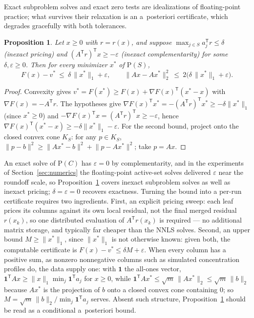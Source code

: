 \documentclass[pdflatex,sn-mathphys-num]{sn-jnl}
\theoremstyle{thmstyleone}
\newtheorem{proposition}{Proposition}
\theoremstyle{thmstyletwo}
\newcommand{\T}{{\mathsf T}}
\newcommand{\prob}[1]{\mathrm{P}(#1)}
\begin{document}
Exact subproblem solves and exact zero tests are idealizations of
floating-point practice; what survives their relaxation is an
a~posteriori certificate, which degrades gracefully with both
tolerances.

\begin{proposition}\label{prop:inexact}
Let $x\ge0$ with $r=r(x)$, and suppose
$\max_{j\in S} a_j^{\T}r\le\delta$ (inexact pricing) and
$(A^{\T}r)^{\T}x\ge-\varepsilon$ (inexact complementarity) for some
$\delta,\varepsilon\ge0$. Then for every minimizer $x^*$ of $\prob{S}$,
\begin{equation*}
F(x)-v^*\ \le\ \delta\,\lVert x^*\rVert_1+\varepsilon,
\qquad
\lVert Ax-Ax^*\rVert_2^2\ \le\ 2\bigl(\delta\,\lVert
x^*\rVert_1+\varepsilon\bigr).
\end{equation*}
\end{proposition}
\begin{proof}
Convexity gives $v^*=F(x^*)\ge F(x)+\nabla F(x)^{\T}(x^*-x)$ with
$\nabla F(x)=-A^{\T}r$. The hypotheses give
$\nabla F(x)^{\T}x^*=-(A^{\T}r)^{\T}x^*\ge-\delta\lVert x^*\rVert_1$
(since $x^*\ge0$) and $-\nabla F(x)^{\T}x=(A^{\T}r)^{\T}x\ge
-\varepsilon$, hence
$\nabla F(x)^{\T}(x^*-x)\ge-\delta\lVert x^*\rVert_1-\varepsilon$.
For the second bound, project onto the closed convex cone $K_S$: for
any $p\in K_S$,
$\lVert p-b\rVert^2\ge\lVert Ax^*-b\rVert^2+\lVert p-Ax^*\rVert^2$;
take $p=Ax$.
\end{proof}
\par\medskip\noindent
An exact solve of $\prob{C}$ has $\varepsilon=0$ by complementarity,
and in the experiments of Section~\ref{sec:numerics} the
floating-point active-set solves delivered $\varepsilon$ near the
roundoff scale, so Proposition~\ref{prop:inexact} covers inexact
subproblem solves as well as inexact pricing; $\delta=\varepsilon=0$
recovers exactness. Turning the bound into a per-run
certificate requires two ingredients. First, an explicit pricing
sweep: each leaf prices its columns against its own local residual,
not the final merged residual $r(x_k)$, so one distributed evaluation
of $A^{\T}r(x_k)$ is required --- no additional matrix storage, and
typically far cheaper than the NNLS solves. Second, an upper bound
$M\ge\lVert x^*\rVert_1$, since $\lVert x^*\rVert_1$ is not otherwise
known: given both, the computable certificate is
$F(x)-v^*\le\delta M+\varepsilon$. When every column has a positive
sum, as nonzero nonnegative columns such as simulated concentration
profiles do, the data supply one: with $\mathbf 1$ the all-ones
vector, $\mathbf 1^{\T}Ax\ge\lVert x\rVert_1\min_j\mathbf 1^{\T}a_j$
for $x\ge0$, while
$\mathbf 1^{\T}Ax^*\le\sqrt m\,\lVert Ax^*\rVert_2\le\sqrt
m\,\lVert b\rVert_2$ because $Ax^*$ is the projection of $b$ onto a
closed convex cone containing $0$; so
$M=\sqrt m\,\lVert b\rVert_2/\min_j\mathbf 1^{\T}a_j$ serves. Absent
such structure, Proposition~\ref{prop:inexact} should be read as a
conditional a~posteriori bound.
\end{document}
